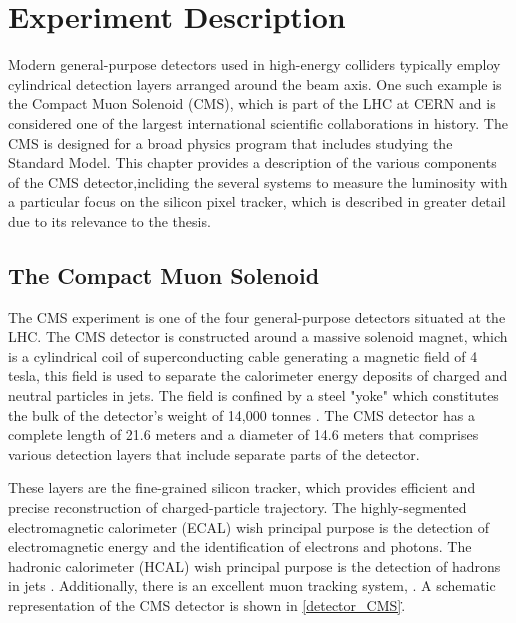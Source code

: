 \chapter{Experiment Description }

Modern general-purpose detectors used in high-energy colliders typically employ cylindrical detection layers arranged around the beam axis. One such example is the Compact Muon Solenoid (CMS), which is part of the LHC at CERN and is considered one of the largest international scientific collaborations in history. The CMS is designed for a broad physics program that includes studying the Standard Model. This chapter provides a description of the various components of the CMS detector,incliding the several systems to measure the luminosity with a particular focus on the silicon pixel tracker, which is described in greater detail due to its relevance to the thesis.
 
\section{The Compact Muon Solenoid}

The CMS experiment is one of the four general-purpose detectors situated at the LHC. The CMS detector is constructed around a massive solenoid magnet, which is a cylindrical coil of superconducting cable generating a magnetic field of 4 tesla, this field is used to separate the calorimeter energy deposits of charged and neutral particles in jets. The field is confined by a steel "yoke" which constitutes the bulk of the detector's weight of 14,000 tonnes \cite{CMS_Exp_2008}. 
The CMS detector has a complete length of 21.6 meters and a diameter of 14.6 meters that  comprises various detection layers that include separate parts of the detector. 

These layers are the fine-grained silicon tracker, which provides efficient and precise reconstruction of charged-particle trajectory. The highly-segmented electromagnetic calorimeter (ECAL) wish principal purpose is the detection of  electromagnetic energy and the identification of electrons and photons. The hadronic calorimeter (HCAL) wish principal purpose is the detection of hadrons in jets  \cite{CMS_Exp_2008}. Additionally, there is an excellent muon tracking system, . A schematic representation of the CMS detector is shown in \ref{detector_CMS}.\.%


